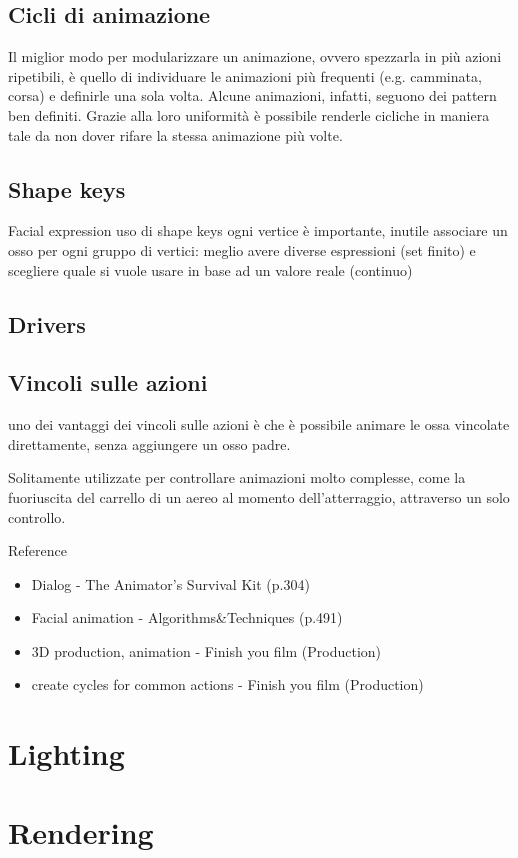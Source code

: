 \subsection{Cicli di animazione}
Il miglior modo per modularizzare un animazione, ovvero spezzarla in più azioni ripetibili, è quello di individuare le animazioni più frequenti (e.g. camminata, corsa) e definirle una sola volta.
Alcune animazioni, infatti, seguono dei pattern ben definiti.
Grazie alla loro uniformità è possibile renderle cicliche in maniera tale da non dover rifare la stessa animazione più volte.
\subsection{Shape keys}
Facial expression
uso di shape keys
ogni vertice è importante, inutile associare un osso per ogni gruppo di vertici: meglio avere diverse espressioni (set finito) e scegliere quale si vuole usare in base ad un valore reale (continuo)
\subsection{Drivers}
\subsection{Vincoli sulle azioni}
uno dei vantaggi dei vincoli sulle azioni è che è possibile animare le ossa vincolate direttamente, senza aggiungere un osso padre.

Solitamente utilizzate per controllare animazioni molto complesse, come la fuoriuscita del carrello di un aereo al momento dell'atterraggio, attraverso un solo controllo.

Reference
\begin{itemize}
    \item Dialog - The Animator's Survival Kit (p.304) 
    \item Facial animation - Algorithms\&Techniques (p.491)
    \item 3D production, animation - Finish you film (Production)
        \item create cycles for common actions - Finish you film (Production)
\end{itemize}
\section{Lighting}
\section{Rendering}

